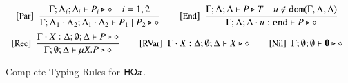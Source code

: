 \begin{figure}[t!]
\[\begin{array}{c}
		{\footnotesize[\textrm{\small Par}]}~~\displaystyle \frac { 
			\Gamma; \Lambda_{i}; \Delta_{i} \vdash P_{i} \triangleright \diamond \quad i=1,2
		 }{ 
			\Gamma; \Lambda_{1} \cdot \Lambda_2; \Delta_{1} \cdot \Delta_2 \vdash P_1 \;|\; P_2 \triangleright \diamond
		 } 
		\qquad
		{\footnotesize[\textrm{\small End}]}~~\displaystyle \frac { 
			\Gamma; \Lambda; \Delta  \vdash P \triangleright T \quad u \not\in \mathtt{dom}(\Gamma, \Lambda,\Delta)
		 }{ 
			\Gamma; \Lambda; \Delta \cdot u: \mathtt{end}  \vdash P \triangleright \diamond
		 } 
		\\[4mm]

	 	{\footnotesize[\textrm{\small Rec}]}~~\displaystyle \frac { 
			\Gamma \cdot X: \Delta; \emptyset; \Delta  \vdash P \triangleright \diamond
		 }{ 
			\Gamma ; \emptyset; \Delta  \vdash \mu X. P \triangleright \diamond
		 } 
		\qquad
		{\footnotesize[\textrm{\small RVar}]}~~\Gamma \cdot X: \Delta; \emptyset; \Delta  \vdash X \triangleright \diamond
		\qquad
		{\footnotesize[\textrm{\small Nil}]}~~\Gamma; \emptyset; \emptyset \vdash \mathbf{0} \triangleright \diamond
	\end{array}
\]
\caption{Complete Typing Rules for $\mathsf{HO}\pi$.\label{fig:typerulesmy}}
\end{figure}



